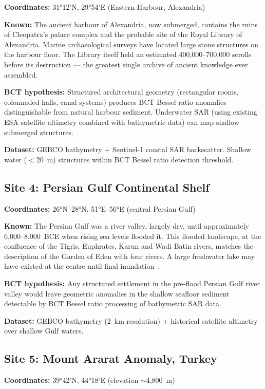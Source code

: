 \documentclass[12pt,twocolumn]{article}
\begin{document}
\textbf{Coordinates:} 31°12'N, 29°54'E (Eastern Harbour,
Alexandria)

\textbf{Known:} The ancient harbour of Alexandria, now
submerged, contains the ruins of Cleopatra's palace complex
and the probable site of the Royal Library of Alexandria.
Marine archaeological surveys have located large stone
structures on the harbour floor. The Library itself held
an estimated 400,000--700,000 scrolls before its destruction
--- the greatest single archive of ancient knowledge ever
assembled.

\textbf{BCT hypothesis:} Structured architectural geometry
(rectangular rooms, colonnaded halls, canal systems) produces
BCT Bessel ratio anomalies distinguishable from natural
harbour sediment. Underwater SAR (using existing ESA
satellite altimetry combined with bathymetric data) can
map shallow submerged structures.

\textbf{Dataset:} GEBCO bathymetry + Sentinel-1 coastal SAR
backscatter. Shallow water ($<$20~m) structures within BCT
Bessel ratio detection threshold.

\subsection{Site 4: Persian Gulf Continental Shelf}

\textbf{Coordinates:} 26°N--28°N, 51°E--56°E (central
Persian Gulf)

\textbf{Known:} The Persian Gulf was a river valley, largely
dry, until approximately 6,000--8,000~BCE when rising sea
levels flooded it. This flooded landscape, at the confluence
of the Tigris, Euphrates, Karun and Wadi Batin rivers,
matches the description of the Garden of Eden with four
rivers. A large freshwater lake may have existed at the
centre until final inundation~\cite{Rose2010}.

\textbf{BCT hypothesis:} Any structured settlement in the
pre-flood Persian Gulf river valley would leave geometric
anomalies in the shallow seafloor sediment detectable by
BCT Bessel ratio processing of bathymetric SAR data.

\textbf{Dataset:} GEBCO bathymetry (2~km resolution) +
historical satellite altimetry over shallow Gulf waters.

\subsection{Site 5: Mount Ararat Anomaly, Turkey}

\textbf{Coordinates:} 39°42'N, 44°18'E (elevation
$\sim$4,800~m)
\end{document}
